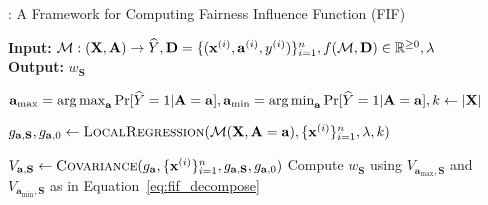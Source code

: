 \begin{algorithm}
	\caption{{\fairXplainer}: A Framework for Computing  Fairness Influence Function (FIF)}\label{algo:framework}
	\hspace*{\algorithmicindent} \textbf{Input:} $ \mathcal{M}: (\mathbf{X}, \mathbf{A}) \rightarrow \widehat{Y},  \mathbf{D} = \{(\mathbf{x}^{(i)}, \mathbf{a}^{(i)}, y^{(i)})\}_{i=1}^n, f(\mathcal{M}, \mathbf{D}) \in \mathbb{R}^{\geq 0}, \lambda $  \\
	\hspace*{\algorithmicindent} \textbf{Output:} $ w_{\mathbf{S}}$ 
	\begin{algorithmic}[1]
		\State $ \mathbf{a}_{\max} = \operatorname*{arg\,max}_{\mathbf{a}} \Pr[\widehat{Y} = 1 | \mathbf{A} = \mathbf{a}], \mathbf{a}_{\min} = \operatorname*{arg\,min}_{\mathbf{a}} \Pr[\widehat{Y} = 1 | \mathbf{A} = \mathbf{a}], k \gets    |\mathbf{X}| $
		\label{algo_line:fif_computation_start}
		
		 
		\State $ g_{\mathbf{a}, \mathbf{S}},g_{\mathbf{a}, 0} \gets \textsc{LocalRegression}(\mathcal{M}(\mathbf{X}, \mathbf{A} = \mathbf{a}), \{\mathbf{x}^{(i)}\}_{i=1}^n, \lambda, k) $
		
		\State $ V_{\mathbf{a}, \mathbf{S}} \gets \textsc{Covariance}(g_{\mathbf{a}},  \{\mathbf{x}^{(i)}\}_{i=1}^n, g_{\mathbf{a}, \mathbf{S}},g_{\mathbf{a}, 0}) $
		\EndFor
		\State Compute $ w_{\mathbf{S}}$ using  $V_{\mathbf{a}_{\max},\mathbf{S}}$ and $V_{\mathbf{a}_{\min},\mathbf{S}}$ as in Equation~\eqref{eq:fif_decompose}
		\label{algo_line:fif_computation_end}
		

\end{algorithmic}
\end{algorithm}
